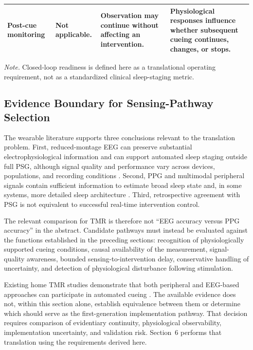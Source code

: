 \begin{table}[t]
\begin{tabularx}{\textwidth}{
@{}
>{\raggedright\arraybackslash}p{2.7cm}
>{\raggedright\arraybackslash}X
>{\raggedright\arraybackslash}X
>{\raggedright\arraybackslash}X
@{}
}
\addlinespace[1.2mm]

\textbf{Post-cue monitoring}
&
Not applicable.
&
Observation may continue without affecting an intervention.
&
Physiological responses influence whether subsequent cueing continues,
changes, or stops.
\\

\bottomrule

\end{tabularx}

\vspace{1mm}

\begin{minipage}{\textwidth}
\footnotesize
\textit{Note.}
Closed-loop readiness is defined here as a translational operating requirement,
not as a standardized clinical sleep-staging metric.
\end{minipage}

\end{table}


\subsection{Evidence Boundary for Sensing-Pathway Selection}

The wearable literature supports three conclusions relevant to the translation
problem. First, reduced-montage EEG can preserve substantial
electrophysiological information and can support automated sleep staging outside
full PSG, although signal quality and performance vary across devices,
populations, and recording conditions
\citep{arnal2020dreem,ravindran2025dreem}. Second, PPG and multimodal peripheral
signals contain sufficient information to estimate broad sleep state and, in
some systems, more detailed sleep architecture
\citep{korkalainen2020ppg,chinoy2021consumer,svensson2024oura}. Third,
retrospective agreement with PSG is not equivalent to successful real-time
intervention control.

The relevant comparison for TMR is therefore not ``EEG accuracy versus PPG
accuracy'' in the abstract. Candidate pathways must instead be evaluated
against the functions established in the preceding sections: recognition of
physiologically supported cueing conditions, causal availability of the
measurement, signal-quality awareness, bounded sensing-to-intervention delay,
conservative handling of uncertainty, and detection of physiological
disturbance following stimulation.

Existing home TMR studies demonstrate that both peripheral and EEG-based
approaches can participate in automated cueing
\citep{whitmore2022improving,salfi2025promoting}. The available evidence does
not, within this section alone, establish equivalence between them or determine
which should serve as the first-generation implementation pathway. That
decision requires comparison of evidentiary continuity, physiological
observability, implementation uncertainty, and validation risk. Section~6
performs that translation using the requirements derived here.